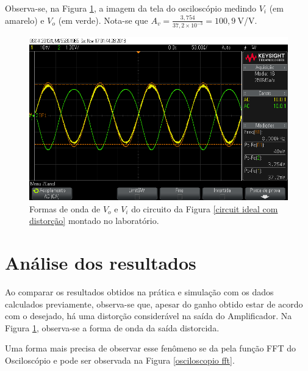 \documentclass[journal, a4paper]{IEEEtran}
\begin{document}
    \tab Observa-se, na Figura \ref{osciloscopio lab com distorção}, a imagem da tela do osciloscópio medindo $V_i$ (em amarelo) e $V_o$ (em verde). Nota-se que $A_v = \frac{3,754}{37,2 \times 10^{-3}} = 100,9 \:$V/V.
        \begin{figure}[H]
    		\begin{center}
    		\includegraphics[width=\columnwidth]{osciloscopio_distorcao.png}
    		\caption{Formas de onda de $V_o$ e $V_i$ do circuito da Figura \ref{circuit ideal com distorção} montado no laboratório.}
    		\label{osciloscopio lab com distorção}
    		\end{center}
    	\end{figure}
        
        
\section{Análise dos resultados}
    \tab Ao comparar os resultados obtidos na prática e simulação com os dados calculados previamente, observa-se que, apesar do ganho obtido estar de acordo com o desejado, há uma distorção considerável na saída do Amplificador. Na Figura \ref{osciloscopio lab com distorção}, observa-se a forma de onda da saída distorcida. 
    
    \tab Uma forma mais precisa de observar esse fenômeno se da pela função FFT do Osciloscópio e pode ser observada na Figura \ref{osciloscopio fft}. 
    
\end{document}

